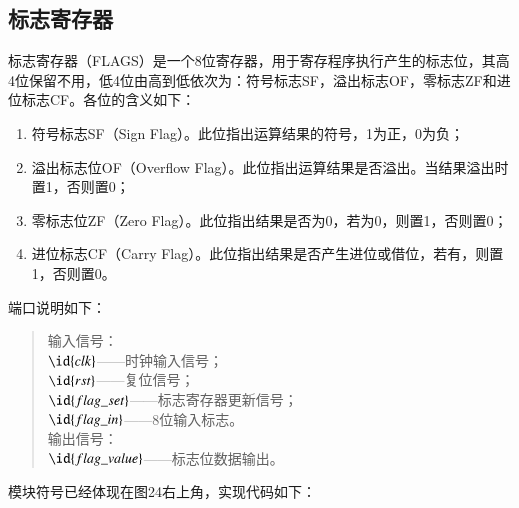\documentclass[titlepage, 11pt]{article}
\begin{document}
		\subsection{标志寄存器}
		标志寄存器（FLAGS）是一个8位寄存器，用于寄存程序执行产生的标志位，其高4位保留不用，低4位由高到低依次为：符号标志SF，溢出标志OF，零标志ZF和进位标志CF。各位的含义如下：
			\begin{enumerate}
				\item 符号标志SF（Sign Flag）。此位指出运算结果的符号，1为正，0为负；
				\item 溢出标志位OF（Overflow Flag）。此位指出运算结果是否溢出。当结果溢出时置1，否则置0；
				\item 零标志位ZF（Zero Flag）。此位指出结果是否为0，若为0，则置1，否则置0；
				\item 进位标志CF（Carry Flag）。此位指出结果是否产生进位或借位，若有，则置1，否则置0。
			\end{enumerate}\par 
		端口说明如下：
			\begin{quote}
				输入信号：\\
				$\id{clk}$——时钟输入信号；\\
				$\id{rst}$——复位信号；\\
				$\id{flag\_set}$——标志寄存器更新信号；\\
				$\id{flag\_in}$——8位输入标志。\\
				输出信号：\\
				$\id{flag\_value}$——标志位数据输出。
			\end{quote}\par  
		模块符号已经体现在图24右上角，实现代码如下：
\end{document}

